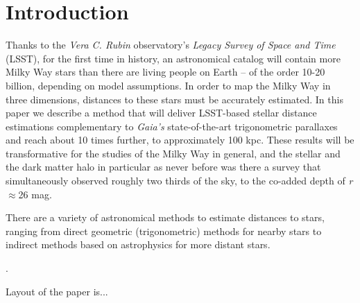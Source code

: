 \section{Introduction} \label{sec:intro}

Thanks to the \textit{Vera C. Rubin} observatory's \textit{Legacy Survey of Space and Time} (LSST), for the first time in history, an astronomical catalog will contain more Milky Way stars than there are living people on Earth -- of the order 10-20 billion, depending on model assumptions. In order to map the Milky Way in three dimensions, distances to these stars must be accurately  estimated. In this paper we describe a method that will deliver LSST-based stellar distance estimations complementary to \textit{Gaia's} state-of-the-art trigonometric parallaxes and reach about 10 times further, to approximately 100 kpc. These results will be transformative for the studies of the Milky Way in general, and the stellar and the dark matter halo in particular as never before was there a survey that simultaneously observed roughly two thirds of the sky, to the co-added depth of \textit{r}$\approx$26 mag. 


There are a variety of astronomical methods to estimate distances to stars, ranging from direct geometric (trigonometric) methods for nearby stars to indirect methods based on astrophysics for more distant stars. 

.

Layout of the paper is...

